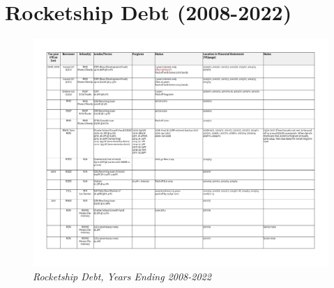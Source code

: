 
\chapter{Rocketship Debt (2008-2022)}\label{ch:debt_2010-22}

\begin{landscape}
  \begin{figure}[ht]
    \vspace{-0.25in}
    \caption[Rocketship Debt, Years Ending 2008–2022]{\textit{Rocketship Debt, Years Ending 2008-2022}}%
    \label{fig:debt_2008-2022} %
    \includegraphics[page=1,scale=0.8]{Debt_2008-2022} %
  \end{figure}
\end{landscape}

